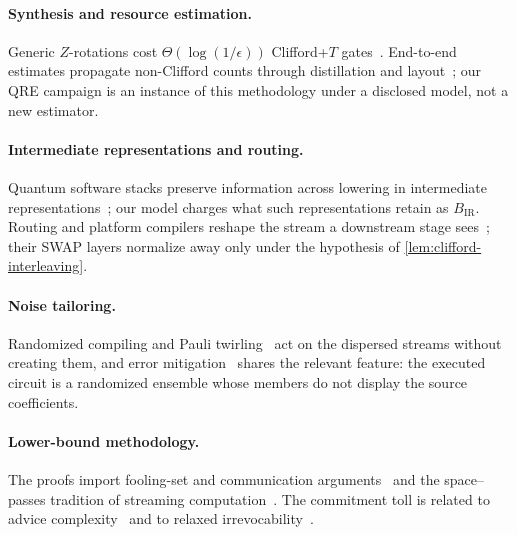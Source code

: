 \documentclass[aps,prx,reprint,superscriptaddress,floatfix,longbibliography]{revtex4-2}
\begin{document}
\paragraph*{Synthesis and resource estimation.}
Generic $Z$-rotations cost $\Theta(\log(1/\epsilon))$ Clifford+$T$
gates~\cite{dawson2006solovay,kliuchnikov2013fast,ross2016optimal,selinger2015efficient,gheorghiu2022tcount}.
End-to-end estimates propagate non-Clifford counts through distillation
and layout~\cite{bravyi2005magic,gidney2021factor,beverland2022assessing,babbush2021focus};
our QRE campaign is an instance of this methodology under a disclosed
model, not a new estimator.

\paragraph*{Intermediate representations and routing.}
Quantum software stacks preserve information across lowering in
intermediate
representations~\cite{steiger2018projectq,javadi2024qiskit,sivarajah2021tket,watkins2024surfacecode,peduri2022qssa,mccaskey2021mlir};
our model charges what such representations retain as $B_{\mathrm{IR}}$.
Routing and platform compilers reshape the stream a downstream stage
sees~\cite{cowtan2019routing,li2019sabre,martiel2022architecture,kreppel2023shuttling,tan2024dpqa};
their SWAP layers normalize away only under the hypothesis of
\cref{lem:clifford-interleaving}.

\paragraph*{Noise tailoring.}
Randomized compiling and Pauli
twirling~\cite{wallman2016noise,hashim2021randomized,knill2005realistically}
act on the dispersed streams without creating them, and error
mitigation~\cite{cai2023mitigation,vandenberg2023probabilistic} shares the
relevant feature: the executed circuit is a randomized ensemble whose
members do not display the source coefficients.

\paragraph*{Lower-bound methodology.}
The proofs import fooling-set and communication
arguments~\cite{kushilevitz1997communication,sipser2012introduction} and
the space--passes tradition of streaming
computation~\cite{munro1980selection,alon1999space,guha2008tight,francois2014unidirectional}.
The commitment toll is related to advice
complexity~\cite{bockenhauer2014string,boyar2017online} and to
relaxed irrevocability~\cite{boyar2022relaxing}.
\end{document}
